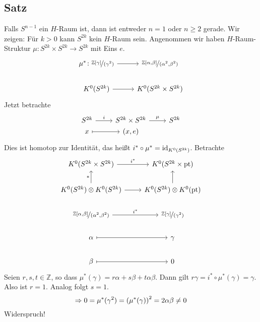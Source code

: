 \subsection{Satz} %
\label{sub:44}
Falls $S^{n-1}$ ein $H$-Raum ist, dann ist entweder $n=1$ oder $n\ge 2$ gerade.
Wir zeigen: Für $k>0$ kann $S^{2k}$ kein $H$-Raum sein. Angenommen wir haben $H$-Raum-Struktur $\mu \colon S^{2k} \times S^{2k} \to S^{2k}$ mit Eins $e$. 
\[
	\begin{tikzcd}
		\mu^* \colon \nicefrac{\mathds{Z}[\gamma]}{(\gamma^2)} \rar & \nicefrac{\mathds{Z}[\alpha,\beta]}{(\alpha^2,\beta^2)} \\
		K^0(S^{2k}) \rar & K^0(S^{2k} \times S^{2k})
	\end{tikzcd}
\]
Jetzt betrachte
\[
	\begin{tikzcd}[row sep=0cm]
		S^{2k} \rar["i"] & S^{2k} \times S^{2k} \rar["\mu"] & S^{2k} \\
		x \rar[mapsto] & (x,e)
	\end{tikzcd}
\]
Dies ist homotop zur Identität, das heißt $i^* \circ \mu^* = \id_{K^0(S^{2k})}$. Betrachte
\[
	\begin{tikzcd}
		K^0(S^{2k} \times S^{2k}) \rar["i^*"] & K^0(S^{2k}\times \pt) \\
		K^0(S^{2k}) \otimes K^0(S^{2k}) \uar["*"] \rar & K^0(S^{2k}) \otimes K^0(\pt) \uar \\
		\nicefrac{\mathds{Z}[\alpha,\beta]}{(\alpha^2,\beta^2)} \rar["i^*"] & \nicefrac{\mathds{Z}[\gamma]}{(\gamma^2)} \\
		\alpha \rar[mapsto] & \gamma \\
		\beta \rar[mapsto] & 0
	\end{tikzcd}
\]
Seien $r,s,t \in \mathds{Z}$, so dass $\mu^*(\gamma)= r \alpha + s \beta+ t \alpha \beta$. Dann gilt $r \gamma = i^* \circ \mu^*(\gamma)=\gamma$. Also ist $r=1$. Analog folgt
$s=1$.
\[
	\Rightarrow 0 = \mu^*(\gamma^2) = \enbrace*{\mu^*(\gamma)}^2 = 2 \alpha \beta \not=0  
\]
Widerspruch! \bewende

